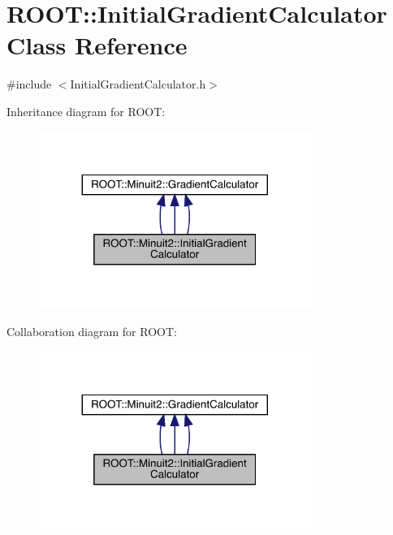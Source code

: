 \hypertarget{classROOT_1_1Minuit2_1_1InitialGradientCalculator}{}\section{R\+O\+OT\+:\+:Initial\+Gradient\+Calculator Class Reference}
\label{classROOT_1_1Minuit2_1_1InitialGradientCalculator}


{\ttfamily \#include $<$Initial\+Gradient\+Calculator.\+h$>$}



Inheritance diagram for R\+O\+OT\+:
\nopagebreak
\begin{figure}[H]
\begin{center}
\leavevmode
\includegraphics[width=251pt]{d6/dbe/classROOT_1_1Minuit2_1_1InitialGradientCalculator__inherit__graph}
\end{center}
\end{figure}


Collaboration diagram for R\+O\+OT\+:
\nopagebreak
\begin{figure}[H]
\begin{center}
\leavevmode
\includegraphics[width=251pt]{dd/d03/classROOT_1_1Minuit2_1_1InitialGradientCalculator__coll__graph}
\end{center}
\end{figure}
